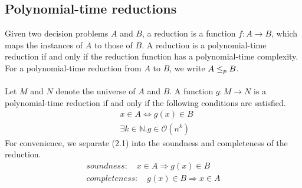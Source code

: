 \subsection{Polynomial-time reductions}
Given two decision problems $A$ and $B$, 
a reduction is a function $f: A \rightarrow B$, 
which maps the instances of $A$ to those of $B$. A reduction is a polynomial-time reduction
if and only if the reduction function has a polynomial-time complexity. 
For a polynomial-time reduction from $A$ to $B$, we write $A \leq_p B$. \\ \\
Let $M$ and $N$ denote the universe of $A$ and $B$. 
A function $g: M \rightarrow N$ is a polynomial-time reduction 
if and only if the following conditions are satisfied.
\begin{align}  
    &x \in A \iff g(x) \in B \\
    &\exists k\in \mathbb{N}. g \in \mathcal{O}(n^k)
\end{align}
For convenience, we separate (2.1) into the soundness and completeness of the reduction.
\begin{align}
    soundness: \quad x \in A \Longrightarrow g(x) \in B \\
    completeness: \quad g(x) \in B \Longrightarrow x \in A
\end{align}

